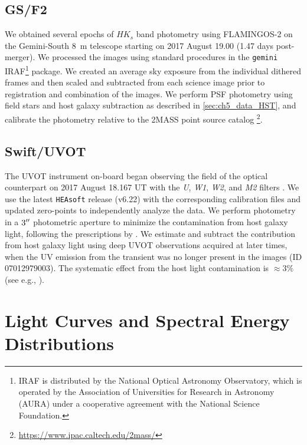 \subsection{GS/F2}
\label{sec:ch5_data_GSF2}
We obtained several epochs of $HK_s$ band photometry using FLAMINGOS-2 on the Gemini-South 8~m telescope \citep{Eikenberry+12} starting on 2017 August 19.00 (1.47 days post-merger). We processed the images using standard procedures in the {\tt gemini} IRAF\footnote{IRAF is distributed by the National Optical Astronomy Observatory, which is operated by the Association of Universities for Research in Astronomy (AURA) under a cooperative agreement with the National Science Foundation.} package.  We created an average sky exposure from the individual dithered frames and then scaled and subtracted from each science image prior to registration and combination of the images. We perform PSF photometry using field stars and host galaxy subtraction as described in \cref{sec:ch5_data_HST}, and calibrate the photometry relative to the 2MASS point source catalog \footnote{\url{https://www.ipac.caltech.edu/2mass/}}.

\subsection{Swift/UVOT}
\label{sec:ch5_data_UVOT}
The UVOT instrument on-board \swift \citep{Gehrels+04, Roming+05} began observing the field of the optical counterpart on 2017 August 18.167 UT with the {\it U}, {\it W1}, {\it W2}, and {\it M2} filters \citep{Evans+17}.  We use the latest {\tt HEAsoft} release (v6.22) with the corresponding calibration files and updated zero-points to independently analyze the data. We perform photometry in a $3\hbox{$^{\prime\prime}$}$ photometric aperture to minimize the contamination from host galaxy light, following the prescriptions by \citet{Brown+09}. We estimate and subtract the contribution from host galaxy light using deep UVOT observations acquired at later times, when the UV emission from the transient was no longer present in the images (\swift ID 07012979003). The systematic effect from the host light contamination is $\approx 3\%$ (see e.g., \citealt{Brown+09}).

\section{Light Curves and Spectral Energy Distributions}
\label{sec:ch5_analysis}


